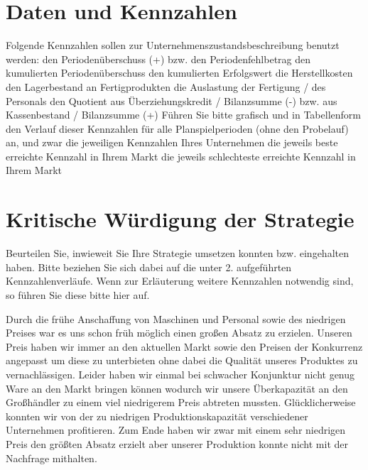 \documentclass[a4paper, 12pt]{article}
\begin{document}
\section{Daten und Kennzahlen}
Folgende Kennzahlen sollen zur Unternehmenszustandsbeschreibung benutzt werden:
den Periodenüberschuss (+) bzw. den Periodenfehlbetrag
den kumulierten Periodenüberschuss
den kumulierten Erfolgswert
die Herstellkosten
den Lagerbestand an Fertigprodukten
die Auslastung der Fertigung / des Personals
den Quotient aus Überziehungskredit / Bilanzsumme (-) 
bzw. aus Kassenbestand / Bilanzsumme (+)
Führen Sie bitte grafisch und in Tabellenform den Verlauf dieser Kennzahlen für alle Planspielperioden (ohne den Probelauf) an, und zwar
die jeweiligen Kennzahlen Ihres Unternehmen
die jeweils beste erreichte Kennzahl in Ihrem Markt
die jeweils schlechteste erreichte Kennzahl in Ihrem Markt



\section{Kritische Würdigung der Strategie}
Beurteilen Sie, inwieweit Sie Ihre Strategie umsetzen konnten bzw. eingehalten haben.
Bitte beziehen Sie sich dabei auf die unter 2. aufgeführten Kennzahlenverläufe.
Wenn zur Erläuterung weitere Kennzahlen notwendig sind, so führen Sie diese bitte hier auf.


Durch die frühe Anschaffung von Maschinen und Personal sowie des niedrigen Preises war es uns schon früh möglich einen großen Absatz zu erzielen.
Unseren Preis haben wir immer an den aktuellen Markt sowie den Preisen der Konkurrenz angepasst um diese zu unterbieten ohne dabei die Qualität unseres Produktes zu vernachlässigen.
Leider haben wir einmal bei schwacher Konjunktur nicht genug Ware an den Markt bringen können wodurch wir unsere Überkapazität an den Großhändler zu einem viel niedrigerem Preis abtreten mussten.
Glücklicherweise konnten wir von der zu niedrigen Produktionskapazität verschiedener Unternehmen profitieren.
Zum Ende haben wir zwar mit einem sehr niedrigen Preis den größten Absatz erzielt aber unserer Produktion konnte nicht mit der Nachfrage mithalten.
\end{document}

